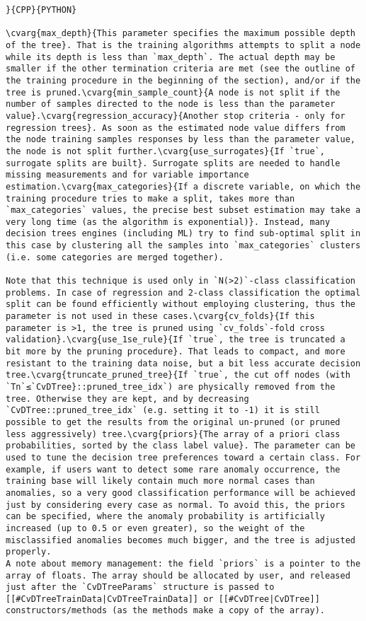\begin{verbatim}
}{CPP}{PYTHON}

\cvarg{max_depth}{This parameter specifies the maximum possible depth of the tree}. That is the training algorithms attempts to split a node while its depth is less than `max_depth`. The actual depth may be smaller if the other termination criteria are met (see the outline of the training procedure in the beginning of the section), and/or if the tree is pruned.\cvarg{min_sample_count}{A node is not split if the number of samples directed to the node is less than the parameter value}.\cvarg{regression_accuracy}{Another stop criteria - only for regression trees}. As soon as the estimated node value differs from the node training samples responses by less than the parameter value, the node is not split further.\cvarg{use_surrogates}{If `true`, surrogate splits are built}. Surrogate splits are needed to handle missing measurements and for variable importance estimation.\cvarg{max_categories}{If a discrete variable, on which the training procedure tries to make a split, takes more than `max_categories` values, the precise best subset estimation may take a very long time (as the algorithm is exponential)}. Instead, many decision trees engines (including ML) try to find sub-optimal split in this case by clustering all the samples into `max_categories` clusters (i.e. some categories are merged together).

Note that this technique is used only in `N(>2)`-class classification problems. In case of regression and 2-class classification the optimal split can be found efficiently without employing clustering, thus the parameter is not used in these cases.\cvarg{cv_folds}{If this parameter is >1, the tree is pruned using `cv_folds`-fold cross validation}.\cvarg{use_1se_rule}{If `true`, the tree is truncated a bit more by the pruning procedure}. That leads to compact, and more resistant to the training data noise, but a bit less accurate decision tree.\cvarg{truncate_pruned_tree}{If `true`, the cut off nodes (with `Tn`≤`CvDTree}::pruned_tree_idx`) are physically removed from the tree. Otherwise they are kept, and by decreasing `CvDTree::pruned_tree_idx` (e.g. setting it to -1) it is still possible to get the results from the original un-pruned (or pruned less aggressively) tree.\cvarg{priors}{The array of a priori class probabilities, sorted by the class label value}. The parameter can be used to tune the decision tree preferences toward a certain class. For example, if users want to detect some rare anomaly occurrence, the training base will likely contain much more normal cases than anomalies, so a very good classification performance will be achieved just by considering every case as normal. To avoid this, the priors can be specified, where the anomaly probability is artificially increased (up to 0.5 or even greater), so the weight of the misclassified anomalies becomes much bigger, and the tree is adjusted properly.
A note about memory management: the field `priors` is a pointer to the array of floats. The array should be allocated by user, and released just after the `CvDTreeParams` structure is passed to [[#CvDTreeTrainData|CvDTreeTrainData]] or [[#CvDTree|CvDTree]] constructors/methods (as the methods make a copy of the array).


\end{verbatim}
